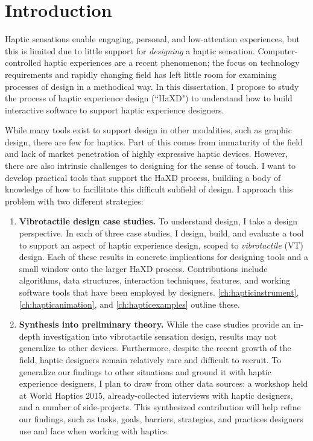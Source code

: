 
\chapter{Introduction}
\label{ch:Introduction}
Haptic sensations enable engaging, personal, and low-attention experiences, but this is limited due to little support for \emph{designing} a haptic sensation.
Computer-controlled haptic experiences are a recent phenomenon; the focus on technology requirements and rapidly changing field has left little room for examining processes of design in a methodical way.
In this dissertation, I propose to study the process of haptic experience design (``HaXD") to understand how to build interactive software to support haptic experience designers.

While many tools exist to support design in other modalities, such as graphic design, there are few for haptics.
Part of this comes from immaturity of the field and lack of market penetration of highly expressive haptic devices.
However, there are also intrinsic challenges to designing for the sense of touch.
I want to develop practical tools that support the HaXD process, building a body of knowledge of how to facillitate this difficult subfield of design.
I approach this problem with two different strategies:
\begin{enumerate}
\item \textbf{Vibrotactile design case studies.}
To understand design, I take a design perspective.
In each of three case studies, I design, build, and evaluate a tool to support an aspect of haptic experience design, scoped to \emph{vibrotactile} (VT) design.
Each of these results in concrete implications for designing tools and a small window onto the larger HaXD process.
Contributions include algorithms, data structures, interaction techniques, features, and working software tools that have been employed by designers.
\autoref{ch:hapticinstrument}, \autoref{ch:hapticanimation}, and \autoref{ch:hapticexamples} outline these.

\item \textbf{Synthesis into preliminary theory.}
While the case studies provide an in-depth investigation into vibrotactile sensation design, results may not generalize to other devices.
Furthermore, despite the recent growth of the field, haptic designers remain relatively rare and difficult to recruit.
To generalize our findings to other situations and ground it with haptic experience designers, I plan to draw from other data sources: a workshop held at World Haptics 2015, already-collected interviews with haptic designers, and a number of side-projects.
This synthesized contribution will help refine our findings, such as tasks, goals, barriers, strategies, and practices designers use and face when working with haptics.
\end{enumerate}


